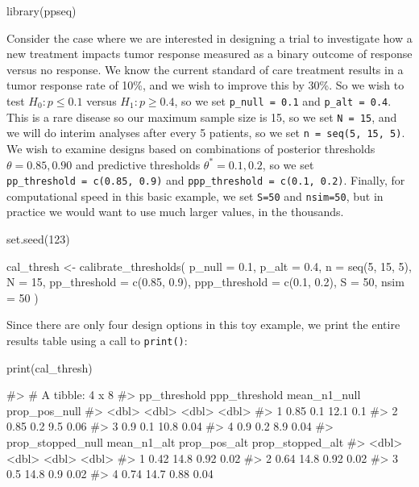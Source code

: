 \begin{Schunk}
\begin{Sinput}
library(ppseq)
\end{Sinput}
\end{Schunk}

Consider the case where we are interested in designing a trial to
investigate how a new treatment impacts tumor response measured as a
binary outcome of response versus no response. We know the current
standard of care treatment results in a tumor response rate of 10\%, and
we wish to improve this by 30\%. So we wish to test \(H_0: p \leq 0.1\)
versus \(H_1: p \geq 0.4\), so we set \texttt{p\_null\ =\ 0.1} and
\texttt{p\_alt\ =\ 0.4}. This is a rare disease so our maximum sample
size is 15, so we set \texttt{N\ =\ 15}, and we will do interim analyses
after every 5 patients, so we set \texttt{n\ =\ seq(5,\ 15,\ 5)}. We
wish to examine designs based on combinations of posterior thresholds
\(\theta = {0.85, 0.90}\) and predictive thresholds
\(\theta^*={0.1, 0.2}\), so we set
\texttt{pp\_threshold\ =\ c(0.85,\ 0.9)} and
\texttt{ppp\_threshold\ =\ c(0.1,\ 0.2)}. Finally, for computational
speed in this basic example, we set \texttt{S=50} and \texttt{nsim=50},
but in practice we would want to use much larger values, in the
thousands.

\begin{Schunk}
\begin{Sinput}
set.seed(123)

cal_thresh <-
  calibrate_thresholds(
    p_null = 0.1, 
    p_alt = 0.4,
    n = seq(5, 15, 5), 
    N = 15,
    pp_threshold = c(0.85, 0.9),
    ppp_threshold = c(0.1, 0.2),
    S = 50, 
    nsim = 50
    )
\end{Sinput}
\end{Schunk}

Since there are only four design options in this toy example, we print
the entire results table using a call to \texttt{print()}:

\begin{Schunk}
\begin{Sinput}
print(cal_thresh)
\end{Sinput}
\begin{Soutput}
#> # A tibble: 4 x 8
#>   pp_threshold ppp_threshold mean_n1_null prop_pos_null
#>          <dbl>         <dbl>        <dbl>         <dbl>
#> 1         0.85           0.1         12.1          0.1 
#> 2         0.85           0.2          9.5          0.06
#> 3         0.9            0.1         10.8          0.04
#> 4         0.9            0.2          8.9          0.04
#>   prop_stopped_null mean_n1_alt prop_pos_alt prop_stopped_alt
#>               <dbl>       <dbl>        <dbl>            <dbl>
#> 1              0.42        14.8         0.92             0.02
#> 2              0.64        14.8         0.92             0.02
#> 3              0.5         14.8         0.9              0.02
#> 4              0.74        14.7         0.88             0.04
\end{Soutput}
\end{Schunk}

